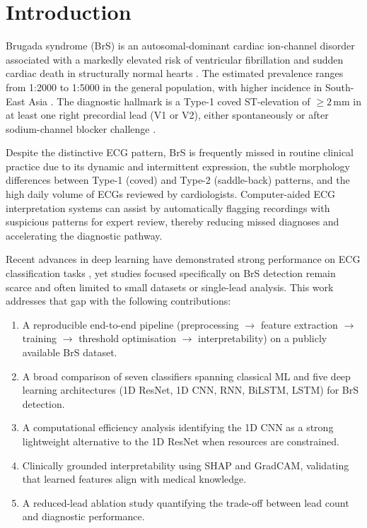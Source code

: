 \documentclass[journal, 10pt, twoside]{IEEEtran}
\begin{document}
\section{Introduction}
\label{sec:intro}

Brugada syndrome (BrS) is an autosomal-dominant cardiac ion-channel disorder
associated with a markedly elevated risk of ventricular fibrillation and
sudden cardiac death in structurally normal hearts \cite{brugada1992right}.
The estimated prevalence ranges from 1:2000 to 1:5000 in the general
population, with higher incidence in South-East Asia \cite{antzelevitch2005brugada}.
The diagnostic hallmark is a Type-1 coved ST-elevation of $\geq 2$\,mm
in at least one right precordial lead (V1 or V2), either spontaneously
or after sodium-channel blocker challenge \cite{priori2013hrs}.

Despite the distinctive ECG pattern, BrS is frequently missed in routine
clinical practice due to its dynamic and intermittent expression, the
subtle morphology differences between Type-1 (coved) and Type-2 (saddle-back)
patterns, and the high daily volume of ECGs reviewed by cardiologists.
Computer-aided ECG interpretation systems can assist by automatically
flagging recordings with suspicious patterns for expert review, thereby
reducing missed diagnoses and accelerating the diagnostic pathway.

Recent advances in deep learning have demonstrated strong performance on
ECG classification tasks \cite{hannun2019cardiologist, ribeiro2020automatic},
yet studies focused specifically on BrS detection remain scarce and often
limited to small datasets or single-lead analysis.
This work addresses that gap with the following contributions:

\begin{enumerate}
  \item A reproducible end-to-end pipeline (preprocessing $\to$ feature
        extraction $\to$ training $\to$ threshold optimisation $\to$
        interpretability) on a publicly available BrS dataset.
  \item A broad comparison of seven classifiers spanning classical ML
        and five deep learning architectures (1D ResNet, 1D CNN, RNN,
        BiLSTM, LSTM) for BrS detection.
  \item A computational efficiency analysis identifying the 1D CNN as
        a strong lightweight alternative to the 1D ResNet when
        resources are constrained.
  \item Clinically grounded interpretability using SHAP and GradCAM,
        validating that learned features align with medical knowledge.
  \item A reduced-lead ablation study quantifying the trade-off between
        lead count and diagnostic performance.
\end{enumerate}
\end{document}
